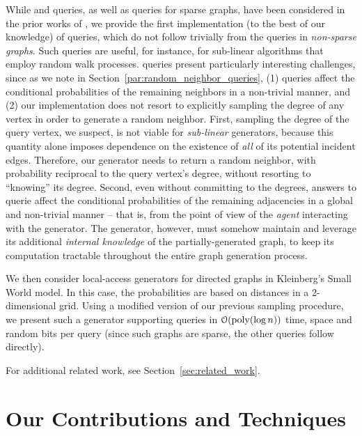 While  and  queries, as well as  queries for sparse graphs, have been considered in the prior works of \cite{reut, huge_old, huge, sparse}, we provide the first implementation (to the best of our knowledge)
of  queries, which do not follow trivially from the
 queries in \emph{non-sparse graphs}.
Such queries are useful, for instance, for sub-linear algorithms that employ random walk processes.
 queries
present particularly interesting challenges,  since as we note in 
Section~\ref{par:random_neighbor_queries},
(1)  queries affect the conditional probabilities
of the remaining neighbors in a non-trivial manner, and
(2) our implementation does not resort to explicitly sampling the degree of any vertex in order to generate a random neighbor.
First, sampling the degree of the query vertex, we suspect, is not viable for \emph{sub-linear} generators,
because this quantity alone imposes dependence on the existence of \emph{all} of its potential incident edges.
Therefore, our generator needs to return a random neighbor, with probability reciprocal to the query vertex's degree,
without resorting to ``knowing'' its degree.
Second, even without committing to the degrees, answers to  querie
affect the conditional probabilities of the remaining adjacencies in a global and non-trivial manner
-- that is, from the point of view of the \emph{agent} interacting with the generator.
The generator, however, must somehow maintain and leverage its additional \emph{internal knowledge}
of the partially-generated graph, to keep its computation tractable throughout the entire graph generation process.

We then consider local-access generators for directed graphs in Kleinberg's Small World model.
In this case, the probabilities are based on distances in a 2-dimensional grid.
Using a modified version of our previous sampling procedure,
we present such a generator supporting  queries in 
$\mathcal{O}(\mathrm{poly}(\log n))$ time, space and random bits per query (since such graphs
are sparse, the other queries follow directly).

For additional related work, see Section~\ref{sec:related_work}.




\section{Our Contributions and Techniques}

